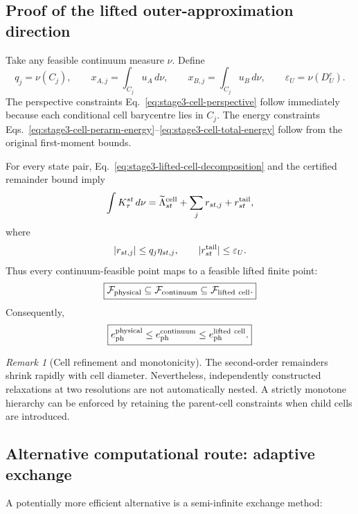 \documentclass[11pt]{article}
\theoremstyle{remark}
\newtheorem{remark}{Remark}
\begin{document}
\subsection{Proof of the lifted outer-approximation direction}

Take any feasible continuum measure \(\nu\).  Define
\[
    q_j=\nu(C_j),
    \qquad
    x_{A,j}=\int_{C_j}u_A\,d\nu,
    \qquad
    x_{B,j}=\int_{C_j}u_B\,d\nu,
    \qquad
    \varepsilon_U=\nu(D_U^c).
\]
The perspective constraints
Eq.~\eqref{eq:stage3-cell-perspective} follow immediately because each
conditional cell barycentre lies in \(C_j\).  The energy constraints
Eqs.~\eqref{eq:stage3-cell-perarm-energy}--\eqref{eq:stage3-cell-total-energy}
follow from the original first-moment bounds.

For every state pair,
Eq.~\eqref{eq:stage3-lifted-cell-decomposition} and the certified remainder
bound imply
\[
    \int K_\tau^{st}\,d\nu
    =
    \widetilde\Lambda_{st}^{\rm cell}
    +
    \sum_jr_{st,j}
    +
    r_{st}^{\rm tail},
\]
where
\[
    |r_{st,j}|
    \le
    q_j\eta_{st,j},
    \qquad
    |r_{st}^{\rm tail}|
    \le
    \varepsilon_U.
\]
Thus every continuum-feasible point maps to a feasible lifted finite point:
\begin{equation}
    \boxed{
    \mathcal F_{\rm physical}
    \subseteq
    \mathcal F_{\rm continuum}
    \subseteq
    \mathcal F_{\rm lifted\ cell}.
    }
    \label{eq:stage3-feasible-chain}
\end{equation}
Consequently,
\begin{equation}
    \boxed{
    e_{\rm ph}^{\rm physical}
    \le
    e_{\rm ph}^{\rm continuum}
    \le
    e_{\rm ph}^{\rm lifted\ cell}.
    }
    \label{eq:stage3-objective-chain}
\end{equation}

\begin{remark}[Cell refinement and monotonicity]
The second-order remainders shrink rapidly with cell diameter.  Nevertheless,
independently constructed relaxations at two resolutions are not
automatically nested.  A strictly monotone hierarchy can be enforced by
retaining the parent-cell constraints when child cells are introduced.
\end{remark}

\subsection{Alternative computational route: adaptive exchange}

A potentially more efficient alternative is a semi-infinite exchange method:
\end{document}
